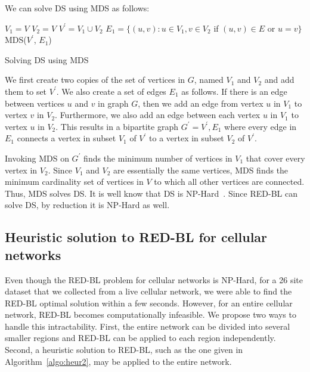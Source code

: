 We can solve DS using MDS as follows:
\IncMargin{1em}
\LinesNumbered
\begin{algorithm}
 $V_1 = V$\;
 $V_2 = V$\;
 $V^{\prime} = V_1 \cup V_2$\;
 $E_1 = \{(u, v): u \in V_1, v \in V_2$ if $(u, v) \in E$ or $u = v\}$\;
 MDS($V^{\prime}$, $E_1$)\;
\caption{Solving DS using MDS}
\label{algo:proof}
\end{algorithm}
\DecMargin{1em}

We first create two copies of the set of vertices in $G$, named $V_1$ and $V_2$ and add them to set $V^{\prime}$. We also create a set of edges $E_1$ as follows. If there is an edge between vertices $u$ and $v$ in graph $G$, then we add an edge from vertex $u$ in $V_1$ to vertex $v$ in $V_2$. Furthermore, we also add an edge between each vertex $u$ in $V_1$ to vertex $u$ in $V_2$. This results in a bipartite graph $G^{\prime}={V^{\prime}, E_1}$ where every edge in $E_1$ connects a vertex in subset $V_1$ of $V^{\prime}$ to a vertex in subset $V_2$ of $V^{\prime}$.

Invoking MDS on $G^{\prime}$ finds the minimum number of vertices in $V_1$ that cover every vertex in $V_2$. Since $V_1$ and $V_2$ are essentially the same vertices, MDS finds the minimum cardinality set of vertices in $V$ to which all other vertices are connected. Thus, MDS solves DS. It is well know that DS is NP-Hard~\cite{Liedloff:2008:FDS:1390853.1390871}. Since RED-BL can solve DS, by reduction it is NP-Hard as well.

\subsection{Heuristic solution to RED-BL for cellular networks}
\label{subsec:heuristics} Even though the RED-BL problem for cellular networks is NP-Hard, for a 26 site dataset that we collected from a live cellular network, we were able to find the RED-BL optimal solution within a few seconds.
However, for an entire cellular network, RED-BL becomes computationally infeasible.
We propose two ways to handle this intractability. First, the entire network can be divided into several smaller regions and RED-BL can be applied to each region independently.
Second, a heuristic solution to RED-BL, such as the one given in Algorithm~\ref{algo:heur2}, may be applied to the entire network.

